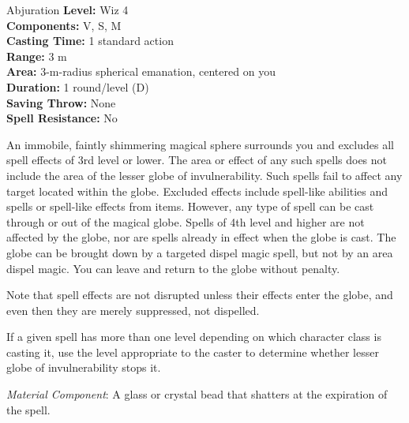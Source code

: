 {Abjuration}
{
	\textbf{Level:}
	Wiz 4\\
	\textbf{Components:}
	V, S, M\\
	\textbf{Casting Time:}
	1 standard action\\
	\textbf{Range:}
	3 m\\
	\textbf{Area:}
	3-m-radius spherical emanation, centered on you\\
	\textbf{Duration:}
	1 round/level (D)\\
	\textbf{Saving Throw:}
	None\\
	\textbf{Spell Resistance:}
	No\\
}
{
	An immobile, faintly shimmering magical sphere surrounds you and excludes all spell effects of 3rd level or lower. The area or effect of any such spells does not include the area of the lesser globe of invulnerability. Such spells fail to affect any target located within the globe. Excluded effects include spell-like abilities and spells or spell-like effects from items. However, any type of spell can be cast through or out of the magical globe. Spells of 4th level and higher are not affected by the globe, nor are spells already in effect when the globe is cast. The globe can be brought down by a targeted dispel magic spell, but not by an area dispel magic. You can leave and return to the globe without penalty.

	Note that spell effects are not disrupted unless their effects enter the globe, and even then they are merely suppressed, not dispelled.

	If a given spell has more than one level depending on which character class is casting it, use the level appropriate to the caster to determine whether lesser globe of invulnerability stops it.

	\textit{Material Component}:
	A glass or crystal bead that shatters at the expiration of the spell.

}
